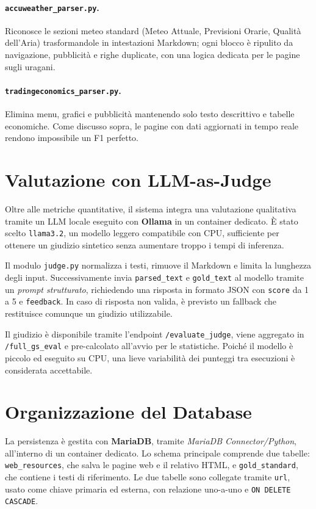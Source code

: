 \documentclass[11pt]{article}
\begin{document}
\paragraph{\texttt{accuweather\_parser.py}.} Riconosce le sezioni meteo standard (Meteo Attuale, Previsioni Orarie, Qualità dell'Aria) trasformandole in intestazioni Markdown; ogni blocco è ripulito da navigazione, pubblicità e righe duplicate, con una logica dedicata per le pagine sugli uragani.
\paragraph{\texttt{tradingeconomics\_parser.py}.} Elimina menu, grafici e pubblicità mantenendo solo testo descrittivo e tabelle economiche. Come discusso sopra, le pagine con dati aggiornati in tempo reale rendono impossibile un F1 perfetto.


\section{Valutazione con LLM-as-Judge}
Oltre alle metriche quantitative, il sistema integra una valutazione qualitativa tramite un LLM locale eseguito con \textbf{Ollama} in un container dedicato. È stato scelto \texttt{llama3.2}, un modello leggero compatibile con CPU, sufficiente per ottenere un giudizio sintetico senza aumentare troppo i tempi di inferenza.

Il modulo \texttt{judge.py} normalizza i testi, rimuove il Markdown e limita la lunghezza degli input. Successivamente invia \texttt{parsed\_text} e \texttt{gold\_text} al modello tramite un \emph{prompt strutturato}, richiedendo una risposta in formato JSON con \texttt{score} da 1 a 5 e \texttt{feedback}. In caso di risposta non valida, è previsto un fallback che restituisce comunque un giudizio utilizzabile.

Il giudizio è disponibile tramite l'endpoint \texttt{/evaluate\_judge}, viene aggregato in \texttt{/full\_gs\_eval} e pre-calcolato all'avvio per le statistiche. Poiché il modello è piccolo ed eseguito su CPU, una lieve variabilità dei punteggi tra esecuzioni è considerata accettabile.

\section{Organizzazione del Database}
La persistenza è gestita con \textbf{MariaDB}, tramite \emph{MariaDB Connector/Python}, all'interno di un container dedicato. Lo schema principale comprende due tabelle: \texttt{web\_resources}, che salva le pagine web e il relativo HTML, e \texttt{gold\_standard}, che contiene i testi di riferimento. Le due tabelle sono collegate tramite \texttt{url}, usato come chiave primaria ed esterna, con relazione uno-a-uno e \texttt{ON DELETE CASCADE}.
\end{document}
